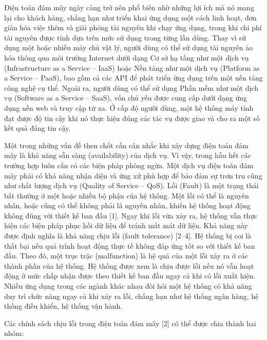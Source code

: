 \documentclass[
  vietnamese,
]{article}
\begin{document}
Điện toán đám mây ngày càng trở nên phổ biến nhờ những lợi ích mà nó
mang lại cho khách hàng, chẳng hạn như triển khai ứng dụng một cách linh
hoạt, đơn giản hóa việc thêm và giải phóng tài nguyên khi chạy ứng dụng,
trong khi chi phí tài nguyên được tính dựa trên mức sử dụng trong từng
lần dùng. Thay vì sử dụng một hoặc nhiều máy chủ vật lý, người dùng có
thể sử dụng tài nguyên ảo hóa thông qua môi trường Internet dưới dạng Cơ
sở hạ tầng như một dịch vụ (Infrastructure as a Service -- IaaS) hoặc
Nền tảng như một dịch vụ (Platform as a Service -- PaaS), bao gồm cả các
API để phát triển ứng dụng trên một nền tảng công nghệ cụ thể. Ngoài ra,
người dùng có thể sử dụng Phần mềm như một dịch vụ (Software as a
Service -- SaaS), vốn chủ yếu được cung cấp dưới dạng ứng dụng nền web
và truy cập từ xa. Ở cấp độ người dùng, một hệ thống máy tính đạt được
độ tin cậy khi nó thực hiện đúng các tác vụ được giao và cho ra một số
kết quả đáng tin cậy.

Một trong những vấn đề then chốt cần cân nhắc khi xây dựng điện toán đám
mây là khả năng sẵn sàng (availability) của dịch vụ. Vì vậy, trong hầu
hết các trường hợp luôn cần có các biện pháp phòng ngừa. Một dịch vụ
điện toán đám mây phải có khả năng nhận diện và ứng xử phù hợp để bảo
đảm sự trơn tru cũng như chất lượng dịch vụ (Quality of Service -- QoS).
Lỗi (Fault) là một trạng thái bất thường ở một hoặc nhiều bộ phận của hệ
thống. Một lỗi có thể là nguyên nhân, hoặc cũng có thể không phải là
nguyên nhân, khiến hệ thống hoạt động không đúng với thiết kế ban đầu
{[}1{]}. Ngay khi lỗi vừa xảy ra, hệ thống vẫn thực hiện các biện pháp
phục hồi dữ liệu để tránh mất mát dữ liệu. Khả năng này được định nghĩa
là khả năng chịu lỗi (fault tolerance) {[}2--4{]}. Hệ thống bị coi là
thất bại nếu quá trình hoạt động thực tế không đáp ứng tốt so với thiết
kế ban đầu. Theo đó, một trục trặc (malfunction) là hệ quả của một lỗi
xảy ra ở các thành phần của hệ thống. Hệ thống được xem là chịu được lỗi
nếu nó vẫn hoạt động ở mức chấp nhận được theo thiết kế ban đầu ngay cả
khi có lỗi xuất hiện. Nhiều ứng dụng trong các ngành khác nhau đòi hỏi
một hệ thống có khả năng duy trì chức năng ngay cả khi xảy ra lỗi, chẳng
hạn như hệ thống ngân hàng, hệ thống điều khiển, hệ thống vận hành.

Các chính sách chịu lỗi trong điện toán đám mây {[}2{]} có thể được chia
thành hai nhóm:
\end{document}
